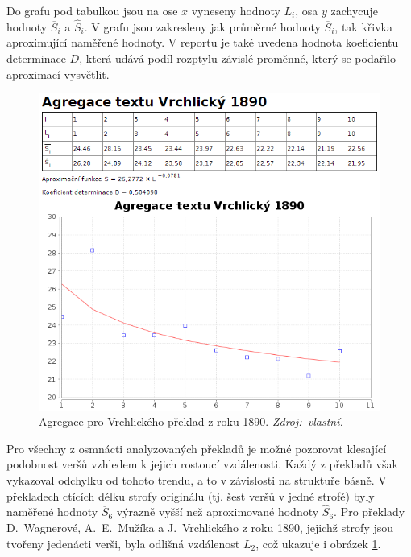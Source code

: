 \documentclass[dp.tex]{subfiles}
\begin{document}
Do grafu pod tabulkou jsou na ose $x$ vyneseny hodnoty $L_i$, osa $y$ zachycuje hodnoty  $\overline{S}_i$ a $\hat{S}_i$. V grafu jsou zakresleny jak průměrné hodnoty $\overline{S}_i$, tak křivka aproximující naměřené hodnoty. V reportu je také uvedena hodnota koeficientu determinace $D$, která udává podíl rozptylu závislé proměnné, který se podařilo aproximací vysvětlit.

\begin{figure}[H]
	\centering
	\includegraphics[max width=\textwidth,keepaspectratio=true]{imgs-70-prakticka/aggregation_vrchlicky_1890}
	\caption[Agregace pro Vrchlického překlad z roku 1890]{Agregace pro Vrchlického překlad z roku 1890. \textit{Zdroj:~vlastní.}}
	\label{fig:agregace-vrchlicky-1890}
\end{figure}

Pro všechny z osmnácti analyzovaných překladů je možné pozorovat klesající podobnost veršů vzhledem k jejich rostoucí vzdálenosti. Každý z překladů však vykazoval odchylku od tohoto trendu, a to v závislosti na struktuře básně. V překladech ctících délku strofy originálu (tj. šest veršů v jedné strofě) byly naměřené hodnoty $\overline{S}_6$ výrazně vyšší než aproximované hodnoty $\hat{S}_6$. Pro překlady D.~Wagnerové, A.~E.~Mužíka a J.~Vrchlického z roku 1890, jejichž strofy jsou tvořeny jedenácti verši, byla odlišná vzdálenost $L_2$, což ukazuje i obrázek \ref{fig:agregace-vrchlicky-1890}.
\end{document}
